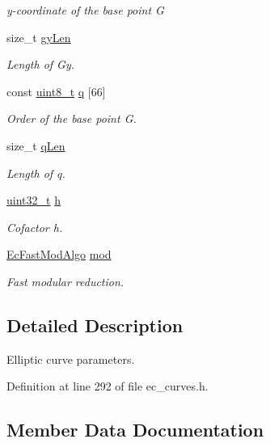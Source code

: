 \begin{DoxyCompactItemize}
\begin{DoxyCompactList}\small\item\em y-\/coordinate of the base point G \end{DoxyCompactList}\item 
size\+\_\+t \hyperlink{structEcCurveInfo_a1ea7f1fc164a055dcd9a03f2112486b2}{gy\+Len}
\begin{DoxyCompactList}\small\item\em Length of Gy. \end{DoxyCompactList}\item 
const \hyperlink{stdint_8h_aba7bc1797add20fe3efdf37ced1182c5}{uint8\+\_\+t} \hyperlink{structEcCurveInfo_a96cbcc6f7b443a7861db66ab2fdddd9b}{q} \mbox{[}66\mbox{]}
\begin{DoxyCompactList}\small\item\em Order of the base point G. \end{DoxyCompactList}\item 
size\+\_\+t \hyperlink{structEcCurveInfo_a262db34150bfda44566a0e8c87ca80c5}{q\+Len}
\begin{DoxyCompactList}\small\item\em Length of q. \end{DoxyCompactList}\item 
\hyperlink{stdint_8h_a435d1572bf3f880d55459d9805097f62}{uint32\+\_\+t} \hyperlink{structEcCurveInfo_acea935f64165e9ebb37c0c602d5767f5}{h}
\begin{DoxyCompactList}\small\item\em Cofactor h. \end{DoxyCompactList}\item 
\hyperlink{ec__curves_8h_ab3954d019918f80a5ba98921659bbb29}{Ec\+Fast\+Mod\+Algo} \hyperlink{structEcCurveInfo_af6ef70c1bdd9cdd65c9a4f1424a328ef}{mod}
\begin{DoxyCompactList}\small\item\em Fast modular reduction. \end{DoxyCompactList}\end{DoxyCompactItemize}


\subsection{Detailed Description}
Elliptic curve parameters. 

Definition at line 292 of file ec\+\_\+curves.\+h.



\subsection{Member Data Documentation}
\mbox{\label{structEcCurveInfo_a6e4de3331be25436f89db95c81ff67fd}} 
